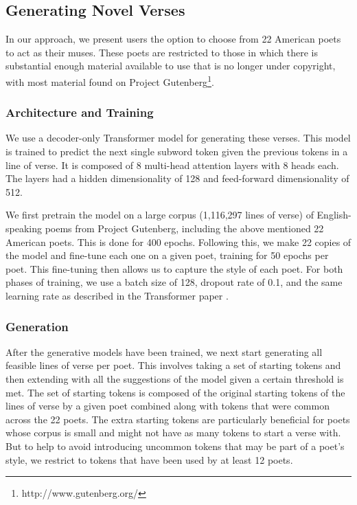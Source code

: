 \documentclass[11pt]{article}
\begin{document}
\subsection{Generating Novel Verses}\label{generate}

In our approach, we present users the option to choose from 22 American poets to act as their muses.
These poets are restricted to those in which there is substantial enough material available to use that is no longer under copyright, with most material found on Project Gutenberg\footnote{http://www.gutenberg.org/}.



\subsubsection{Architecture and Training}

We use a decoder-only Transformer model \cite{vaswani2017} for generating these verses.
This model is trained to predict the next single subword token given the previous tokens in a line of verse.
It is composed of 8 multi-head attention layers with 8 heads each.
The layers had a hidden dimensionality of 128 and feed-forward dimensionality of 512.

We first pretrain the model on a large corpus (1,116,297 lines of verse) of English-speaking poems from Project Gutenberg, including the above mentioned 22 American poets.
This is done for 400 epochs.
Following this, we make 22 copies of the model and fine-tune each one on a given poet, training for 50 epochs per poet.
This fine-tuning then allows us to capture the style of each poet.
For both phases of training, we use a batch size of 128, dropout rate of 0.1, and the same learning rate as described in the Transformer paper \cite{vaswani2017}.




\subsubsection{Generation}

After the generative models have been trained, we next start generating all feasible lines of verse per poet.
This involves taking a set of starting tokens and then extending with all the suggestions of the model given a certain threshold is met.
The set of starting tokens is composed of the original starting tokens of the lines of verse by a given poet combined along with tokens that were common across the 22 poets.
The extra starting tokens are particularly beneficial for poets whose corpus is small and might not have as many tokens to start a verse with.
But to help to avoid introducing uncommon tokens that may be part of a poet's style, we restrict to tokens that have been used by at least 12 poets.
\end{document}
